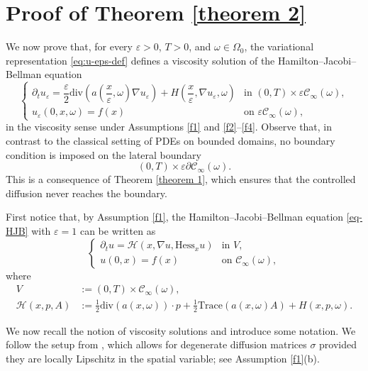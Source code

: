 \documentclass[11pt]{article}
\newcommand{\eps}{\varepsilon}
\theoremstyle{rem}
\begin{document}
\section{Proof of Theorem \ref{theorem 2}}\label{sec proof thm2}

We now prove that, for every $\eps>0$, $T>0$, and $\omega\in\Omega_0$, the variational representation \eqref{eq:u-eps-def} defines a viscosity solution of the Hamilton--Jacobi--Bellman equation
\begin{equation}\label{eq-HJB}
\begin{cases}
\partial_t u_\eps
=
\dfrac{\eps}{2}\mathrm{div}\!\left(
a\!\left(\dfrac{x}{\eps},\omega\right)\nabla u_\eps
\right)
+
H\!\left(
\dfrac{x}{\eps},
\nabla u_\eps,
\omega
\right)
&
\text{in }
(0,T)\times \eps\mathcal C_\infty(\omega),
\\[0.3em]
u_\eps(0,x,\omega)=f(x)
&
\text{on }
\eps\mathcal C_\infty(\omega),
\end{cases}
\end{equation}
in the viscosity sense under Assumptions \ref{f1} and \ref{f2}--\ref{f4}. Observe that, in contrast to the classical setting of PDEs on bounded domains, no boundary condition is imposed on the lateral boundary
\[
(0,T)\times \eps\partial\mathcal C_\infty(\omega).
\]
This is a consequence of Theorem \ref{theorem 1}, which ensures that the controlled diffusion never reaches the boundary.

\medskip

First notice that, by Assumption \ref{f1}, the Hamilton--Jacobi--Bellman equation \eqref{eq-HJB} with $\eps=1$ can be written as
\begin{equation}\label{eq:HJB-general}
\begin{cases}
\partial_t u
=
\mathcal H(x,\nabla u,\mathrm{Hess}_x u)
&
\text{in }V,
\\
u(0,x)=f(x)
&
\text{on }\mathcal C_\infty(\omega),
\end{cases}
\end{equation}
where
\begin{equation}\label{V-calH}
\begin{aligned}
V
&:=
(0,T)\times\mathcal C_\infty(\omega),
\\
\mathcal H(x,p,A)
&:=
\frac12\mathrm{div}(a(x,\omega))\cdot p
+
\frac12\mathrm{Trace}(a(x,\omega)A)
+
H(x,p,\omega).
\end{aligned}
\end{equation}

We now recall the notion of viscosity solutions and introduce some notation. We follow the setup from \cite[Sec.~3.1 and Sec.~7.1]{T13}, which allows for degenerate diffusion matrices $\sigma$ provided they are locally Lipschitz in the spatial variable; see Assumption \ref{f1}(b).
\end{document}
